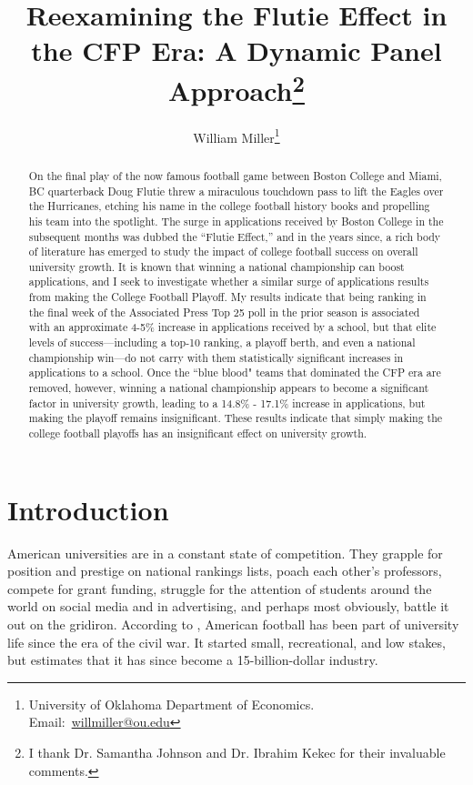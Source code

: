 \documentclass[12pt,english]{article}
\title{Reexamining the Flutie Effect in the CFP Era: A Dynamic Panel Approach\thanks{I thank Dr. Samantha Johnson and Dr. Ibrahim Kekec for their invaluable comments.}}
\author{William Miller\thanks{University of Oklahoma Department of Economics. Email:~\href{mailto:willmiller@ou.edu}{willmiller@ou.edu}}}
\begin{document}
\maketitle
\begin{singlespace}
\begin{abstract}
On the final play of the now famous football game between Boston College and Miami, BC quarterback Doug Flutie threw a miraculous touchdown pass to lift the Eagles over the Hurricanes, etching his name in the college football history books and propelling his team into the spotlight. The surge in applications received by Boston College in the subsequent months was dubbed the ``Flutie Effect,” and in the years since, a rich body of literature has emerged to study the impact of college football success on overall university growth. It is known that winning a national championship can boost applications, and I seek to investigate whether a similar surge of applications results from making the College Football Playoff. My results indicate that being ranking in the final week of the Associated Press Top 25 poll in the prior season is associated with an approximate 4-5\% increase in applications received by a school, but that elite levels of success—including a top-10 ranking, a playoff berth, and even a national championship win—do not carry with them statistically significant increases in applications to a school. Once the ``blue blood" teams that dominated the CFP era are removed, however, winning a national championship appears to become a significant factor in university growth, leading to a 14.8\% - 17.1\% increase in applications, but making the playoff remains insignificant. These results indicate that simply making the college football playoffs has an insignificant effect on university growth. 
\end{abstract}
\end{singlespace}

\section{Introduction}

American universities are in a constant state of competition. They grapple for position and prestige on national rankings lists, poach each other’s professors, compete for grant funding, struggle for the attention of students around the world on social media and in advertising, and perhaps most obviously, battle it out on the gridiron. According to \citet{CFBHistory}, American football has been part of university life since the era of the civil war. It started small, recreational, and low stakes, but \citet{ncaa_finances} estimates that it has since become a 15-billion-dollar industry. 
\end{document}
